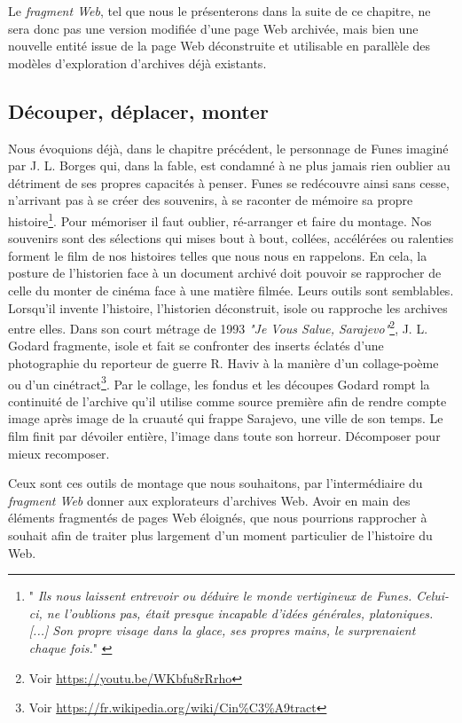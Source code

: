 \documentclass{tufte-book}
\begin{document}
Le \textit{fragment Web}, tel que nous le présenterons dans la suite de ce chapitre, ne sera donc pas une version modifiée d'une page Web archivée, mais bien une nouvelle entité issue de la page Web déconstruite et utilisable en parallèle des modèles d'exploration d'archives déjà existants.    

\subsection{Découper, déplacer, monter}

\par\noindent Nous évoquions déjà, dans le chapitre précédent, le personnage de Funes imaginé par J. L. Borges qui, dans la fable, est condamné à ne plus jamais rien oublier au détriment de ses propres capacités à penser. Funes se redécouvre ainsi sans cesse, n'arrivant pas à se créer des souvenirs, à se raconter de mémoire sa propre histoire\footnote{"\textit{ Ils nous laissent entrevoir ou déduire le monde vertigineux de Funes. Celui-ci, ne l’oublions pas, était presque incapable d’idées générales, platoniques. [...] Son propre visage dans la glace, ses propres mains,  le surprenaient chaque fois.}" \cite{borges_fictions_1974}}. Pour mémoriser il faut oublier, ré-arranger et faire du montage. Nos souvenirs sont des sélections qui mises bout à bout, collées, accélérées ou ralenties forment le film de nos histoires telles que nous nous en rappelons. En cela, la posture de l'historien face à un document archivé doit pouvoir se rapprocher de celle du monter de cinéma face à une matière filmée. Leurs outils sont semblables. Lorsqu'il invente l'histoire, l'historien déconstruit, isole ou rapproche les archives entre elles. Dans son court métrage de 1993 \textit{"Je Vous Salue, Sarajevo"}\footnote{Voir \url{https://youtu.be/WKbfu8rRrho}}, J. L. Godard fragmente, isole et fait se confronter des inserts éclatés d'une photographie du reporteur de guerre R. Haviv à la manière d'un collage-poème ou d'un cinétract\footnote{Voir \url{https://fr.wikipedia.org/wiki/Cin\%C3\%A9tract}}. Par le collage, les fondus et les découpes Godard rompt la continuité de l'archive qu'il utilise comme source première afin de rendre compte image après image de la cruauté qui frappe Sarajevo, une ville de son temps. Le film finit par dévoiler entière, l'image dans toute son horreur. Décomposer pour mieux recomposer.

Ceux sont ces outils de montage que nous souhaitons, par l'intermédiaire du \textit{fragment Web} donner aux explorateurs d'archives Web. Avoir en main des éléments fragmentés de pages Web éloignés, que nous pourrions rapprocher à souhait afin de traiter plus largement d'un moment particulier de l'histoire du Web. 
\end{document}
